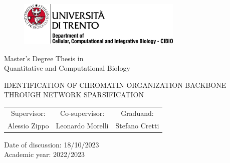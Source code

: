 \graphicspath{{chapters/00_title_page/images/}}

\pagestyle{empty}

\begin{center}
  
  \vspace*{1 cm}
  \begin{figure}[h]
    \centering
    \includegraphics[width=0.7\textwidth]{logo_unitn.png}
  \end{figure}
  \vspace{2 cm}

  \LARGE{Master's Degree Thesis in\\Quantitative and Computational Biology\\}  

  \vspace{2 cm}
  \LARGE\textsc{IDENTIFICATION OF CHROMATIN ORGANIZATION BACKBONE THROUGH NETWORK SPARSIFICATION\\}
  \vspace{2 cm}

  \begin{tabular}{c@{\hskip 2cm}c@{\hskip 2cm}c}
    Supervisor: & Co-supervisor: & Graduand: \\
    Alessio Zippo & Leonardo Morelli & Stefano Cretti
  \end{tabular}

  \vspace{5 cm}

\end{center}

\begin{flushleft}
  \LARGE{Date of discussion: 18/10/2023}\\
  \vspace{0.5 cm}
  \LARGE{Academic year: 2022/2023}\\
\end{flushleft}

\maketitle

